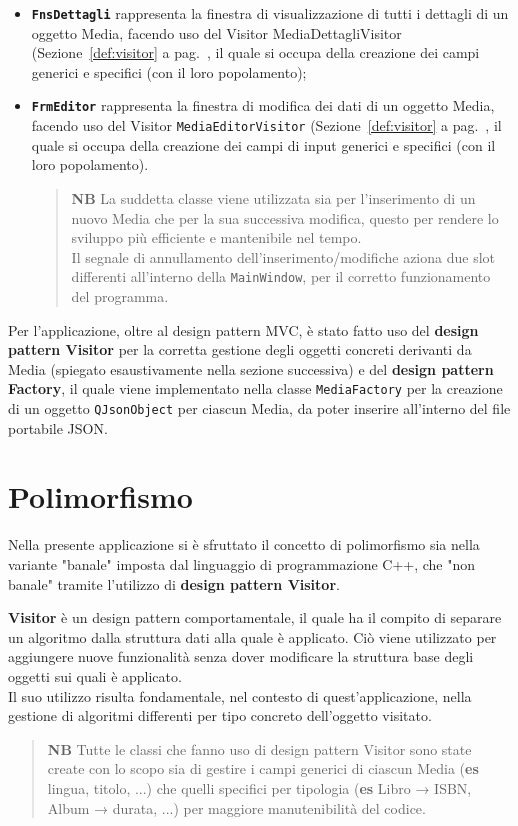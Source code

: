 \documentclass[a4paper,10pt]{article}
\begin{document}
\begin{itemize}
\begin{itemize}
			\item \textbf{\texttt{FnsDettagli}} rappresenta la finestra di visualizzazione di tutti i dettagli di un oggetto Media, facendo uso del Visitor MediaDettagliVisitor (Sezione~\ref{def:visitor} a pag.~\pageref{def:visitor}, il quale si occupa della creazione dei campi generici e specifici (con il loro popolamento);
			\item \textbf{\texttt{FrmEditor}} rappresenta la finestra di modifica dei dati di un oggetto Media, facendo uso del Visitor \texttt{MediaEditorVisitor} (Sezione~\ref{def:visitor} a pag.~\pageref{def:visitor}, il quale si occupa della creazione dei campi di input generici e specifici (con il loro popolamento).\\
			\begin{quote}
				\textbf{NB} La suddetta classe viene utilizzata sia per l'inserimento di un nuovo Media che per la sua successiva modifica, questo per rendere lo sviluppo più efficiente e mantenibile nel tempo.\\
				Il segnale di annullamento dell'inserimento/modifiche aziona due slot differenti all'interno della \texttt{MainWindow}, per il corretto funzionamento del programma.
			\end{quote}
		\end{itemize}
	\end{itemize}
	Per l'applicazione, oltre al design pattern MVC, è stato fatto uso del \textbf{design pattern Visitor} per la corretta gestione degli oggetti concreti derivanti da Media (spiegato esaustivamente nella sezione successiva) e del \textbf{design pattern Factory}, il quale viene implementato nella classe \texttt{MediaFactory} per la creazione di un oggetto \texttt{QJsonObject} per ciascun Media, da poter inserire all'interno del file portabile JSON.
	
	\clearpage
	\section{Polimorfismo}
	Nella presente applicazione si è sfruttato il concetto di polimorfismo sia nella variante "banale" imposta dal linguaggio di programmazione C++, che "non banale" tramite l'utilizzo di \textbf{design pattern Visitor}.
	\begin{defbox}
		\textbf{Visitor} è un design pattern comportamentale, il quale ha il compito di separare un algoritmo dalla struttura dati alla quale è applicato. Ciò viene utilizzato per aggiungere nuove funzionalità senza dover modificare la struttura base degli oggetti sui quali è applicato.\\
		Il suo utilizzo risulta fondamentale, nel contesto di quest'applicazione, nella gestione di algoritmi differenti per tipo concreto dell'oggetto visitato.
	\end{defbox}
	\begin{quote}
		\textbf{NB} Tutte le classi che fanno uso di design pattern Visitor sono state create con lo scopo sia di gestire i campi generici di ciascun Media (\textbf{es} lingua, titolo, ...) che quelli specifici per tipologia (\textbf{es} Libro → ISBN, Album → durata, ...) per maggiore manutenibilità del codice.
	\end{quote}
	
\end{document}
